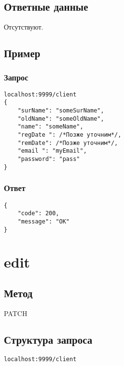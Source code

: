 \section*{Ответные данные}
Отсутствуют.

\section*{Пример}

\subsection*{Запрос}

\begin{lstlisting}
localhost:9999/client
{
	"surName": "someSurName",
	"oldName": "someOldName",
	"name": "someName",
	"regDate ": /*Позже уточним*/,
	"remDate": /*Позже уточним*/,
	"email ": "myEmail",
	"password": "pass"
}
\end{lstlisting}
\hfill

\subsection*{Ответ}

\begin{lstlisting}
{
	"code": 200,
	"message": "OK"
}
\end{lstlisting}
\hfill


\chapter{edit}

\section*{Метод}
PATCH

\section*{Структура запроса}
\begin{lstlisting}
localhost:9999/client
\end{lstlisting}
\hfill

